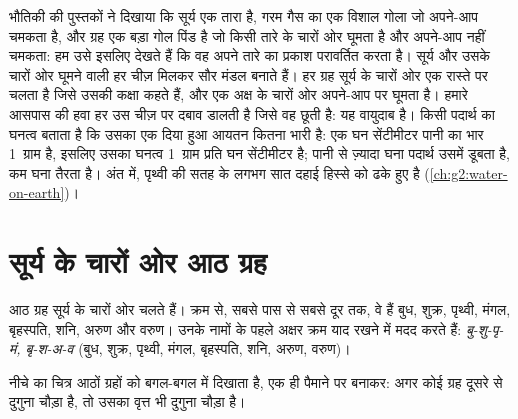 \begin{recall}
भौतिकी की पुस्तकों ने दिखाया कि सूर्य एक तारा है, गरम गैस का एक विशाल गोला जो
अपने-आप चमकता है, और ग्रह एक बड़ा गोल पिंड है जो किसी तारे के चारों ओर घूमता है
और अपने-आप नहीं चमकता: हम उसे इसलिए देखते हैं कि वह अपने तारे का प्रकाश परावर्तित
करता है। सूर्य और उसके चारों ओर घूमने वाली हर चीज़ मिलकर सौर मंडल बनाते हैं। हर ग्रह
सूर्य के चारों ओर एक रास्ते पर चलता है जिसे उसकी कक्षा कहते हैं, और एक अक्ष के चारों
ओर अपने-आप पर घूमता है। हमारे आसपास की हवा हर उस चीज़ पर दबाव डालती है जिसे वह छूती
है: यह वायुदाब है। किसी पदार्थ का घनत्व बताता है कि उसका एक दिया हुआ आयतन कितना
भारी है: एक घन सेंटीमीटर पानी का भार 1~ग्राम है, इसलिए उसका घनत्व 1~ग्राम प्रति घन
सेंटीमीटर है; पानी से ज़्यादा घना पदार्थ उसमें डूबता है, कम घना तैरता है। अंत में, पृथ्वी की सतह के लगभग सात दहाई हिस्से को
 ढके हुए है
(\cref{ch:g2:water-on-earth})।
\end{recall}

\section{सूर्य के चारों ओर आठ ग्रह}

आठ ग्रह सूर्य के चारों ओर चलते हैं। क्रम से, सबसे पास से सबसे दूर तक, वे हैं बुध,
शुक्र, पृथ्वी, मंगल, बृहस्पति, शनि, अरुण और वरुण। उनके नामों के पहले अक्षर क्रम
याद रखने में मदद करते हैं: \emph{बु-शु-पृ-मं, बृ-श-अ-व}
(बुध, शुक्र, पृथ्वी, मंगल,
बृहस्पति, शनि, अरुण, वरुण)।

नीचे का चित्र आठों ग्रहों को बगल-बगल में दिखाता है, एक ही पैमाने पर बनाकर: अगर कोई
ग्रह दूसरे से दुगुना चौड़ा है, तो उसका वृत्त भी दुगुना
चौड़ा है।

